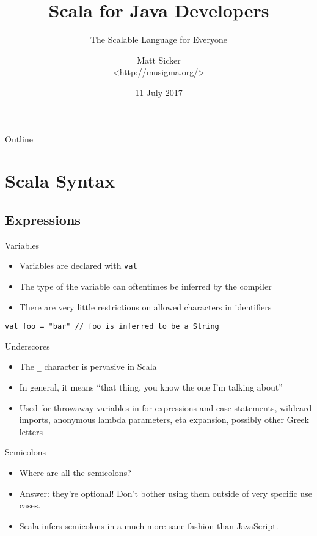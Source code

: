 \documentclass{beamer}
\title{Scala for Java Developers}
\subtitle{The Scalable Language for Everyone}
\author[Matt Sicker @jvz]{Matt Sicker \\ <\url{http://musigma.org/}>}
\institute{SPR Consulting}
\date{11 July 2017}
\begin{document}
\lstset{language=Scala}

\begin{frame}
  \titlepage
\end{frame}

\begin{frame}{Outline}
  \tableofcontents
\end{frame}

\section{Scala Syntax}

\subsection{Expressions}

\begin{frame}[fragile]{Variables}
\begin{itemize}
\item Variables are declared with \lstinline{val}
\item The type of the variable can oftentimes be inferred by the compiler
\item There are very little restrictions on allowed characters in identifiers
\end{itemize}
\begin{lstlisting}
val foo = "bar" // foo is inferred to be a String
\end{lstlisting}
\end{frame}

\begin{frame}{Underscores}
\begin{itemize}
\item The \lstinline{_} character is pervasive in Scala
\item In general, it means ``that thing, you know the one I'm talking about''
\item Used for throwaway variables in for expressions and case statements, wildcard
imports, anonymous lambda parameters, eta expansion, possibly other Greek letters
\end{itemize}
\end{frame}

\begin{frame}{Semicolons}
\begin{itemize}
\item Where are all the semicolons?
\item Answer: they're optional! Don't bother using them outside of very specific use cases.
\item Scala infers semicolons in a much more sane fashion than JavaScript.
\end{itemize}
\end{frame}
\end{document}
